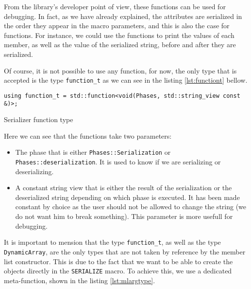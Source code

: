 From the library's developer point of view, these functions can be used for
debugging. In fact, as we have already explained, the attributes are serialized
in the order they appear in the macro parameters, and this is also the case for
functions. For instance, we could use the functions to print the values of each
member, as well as the value of the serialized string, before and after they are
serialized.

Of course, it is not possible to use any function, for now, the only type that
is accepted is the type \texttt{function\_t} as we can see in the listing
\ref{lst:functiont} bellow.

\begin{listing}[ht!]
\begin{verbatim}
using function_t = std::function<void(Phases, std::string_view const &)>;
\end{verbatim}
\caption{Serializer function type}
\label{lst:functiont}
\end{listing}

Here we can see that the functions take two parameters:

\begin{itemize}
  \item The phase that is either \texttt{Phases::Serialization} or
    \texttt{Phases::deserialization}. It is used to know if we are serializing
    or deserializing.
  \item A constant string view that is either the result of the serialization or
    the deserialized string depending on which phase is executed. It has been
    made constant by choice as the user should not be allowed to change the
    string (we do not want him to break something). This parameter is more
    usefull for debugging.
\end{itemize}

It is important to mension that the type \texttt{function\_t}, as well as the
type \texttt{DynamicArray}, are the only types that are not taken by reference
by the member list constructor. This is due to the fact that we want to be able
to create the objects directly in the \texttt{SERIALIZE} macro. To achieve this,
we use a dedicated meta-function, shown in the listing \ref{lst:mlargtype}.

